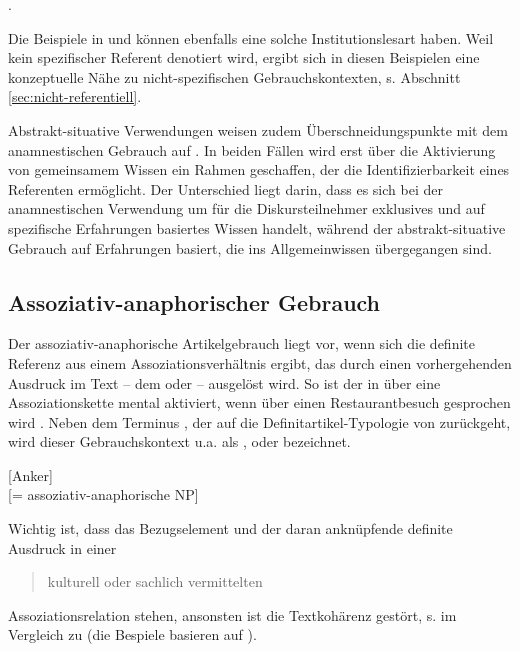 \begin{exe}
	\ex \label{ex:post} .
\end{exe}

\noindent
Die Beispiele in  und  können ebenfalls eine solche Institutionslesart haben. Weil kein spezifischer Referent denotiert wird, ergibt sich in diesen Beispielen eine konzeptuelle Nähe zu nicht-spezifischen Gebrauchskontexten, s. Abschnitt \ref{sec:nicht-referentiell}.

Abstrakt-situative Verwendungen weisen zudem Überschneidungspunkte mit dem anamnestischen Gebrauch auf \parencite[62]{Himmelmann1997}. In beiden Fällen wird erst über die Aktivierung von gemeinsamem Wissen ein Rahmen geschaffen, der die Identifizierbarkeit eines Referenten ermöglicht. Der Unterschied liegt darin, dass es sich bei der anamnestischen Verwendung um für die Diskursteilnehmer exklusives und auf spezifische Erfahrungen basiertes Wissen handelt, während der abstrakt-situative Gebrauch auf Erfahrungen basiert, die ins Allgemeinwissen übergegangen sind. 

\subsection{Assoziativ-anaphorischer Gebrauch}\label{sec:asso}

Der assoziativ-anaphorische Artikelgebrauch liegt vor, wenn sich die definite Referenz aus einem Assoziationsverhältnis ergibt, das durch einen vorhergehenden Ausdruck im Text -- dem  \parencite[49]{Hawkins1978} oder  \parencite[6]{Cui2014} -- ausgelöst wird. So ist der  in  über eine Assoziationskette mental aktiviert, wenn über einen Restaurantbesuch gesprochen wird \parencite[Beispiel in Anlehnung an][50]{Schwarz2000}. Neben dem Terminus , der auf die Definitartikel-Typologie von \textcite{Hawkins1978} zurückgeht, wird dieser Gebrauchskontext u.a. als  \parencite{Clark1977},  \parencite{Prince1981} oder  \parencite{Schwarz2000} bezeichnet.  

\begin{exe}
	\ex \label{ex:asso}  [Anker] \\ [= assoziativ-anaphorische NP]  
\end{exe}
\noindent 
Wichtig ist, dass das Bezugselement und der daran anknüpfende definite Ausdruck in einer \blockcquote[36]{Himmelmann1997}{kulturell oder sachlich vermittelten} Assoziationsrelation stehen, ansonsten ist die Textkohärenz gestört, s.  im Vergleich zu  (die Bespiele basieren auf \cite[123]{Hawkins1978}).

